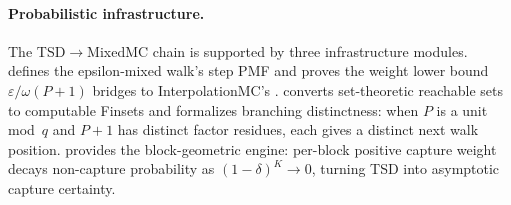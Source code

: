 \paragraph{Probabilistic infrastructure.}
The TSD$\to$MixedMC chain is supported by three infrastructure
modules.   defines the
epsilon-mixed walk's step PMF and proves the weight lower bound
$\varepsilon/\omega(P{+}1)$ bridges to InterpolationMC's
.   converts
set-theoretic reachable sets to computable Finsets and formalizes
branching distinctness: when $P$ is a unit mod~$q$ and $P{+}1$ has
distinct factor residues, each gives a distinct next walk position.
 provides the block-geometric
engine: per-block positive capture weight decays non-capture
probability as $(1{-}\delta)^K \to 0$, turning TSD into asymptotic
capture certainty.

